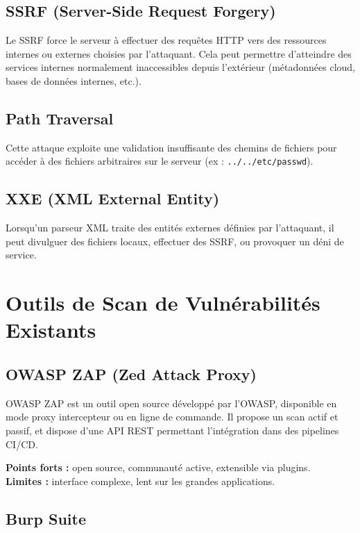 \documentclass[12pt, a4paper]{report}
\begin{document}
\subsection{SSRF (Server-Side Request Forgery)}

Le SSRF force le serveur à effectuer des requêtes HTTP vers des ressources
internes ou externes choisies par l'attaquant. Cela peut permettre d'atteindre
des services internes normalement inaccessibles depuis l'extérieur (métadonnées
cloud, bases de données internes, etc.).

\subsection{Path Traversal}

Cette attaque exploite une validation insuffisante des chemins de fichiers pour
accéder à des fichiers arbitraires sur le serveur (ex : \texttt{../../etc/passwd}).

\subsection{XXE (XML External Entity)}

Lorsqu'un parseur XML traite des entités externes définies par l'attaquant,
il peut divulguer des fichiers locaux, effectuer des SSRF, ou provoquer un déni
de service.

\section{Outils de Scan de Vulnérabilités Existants}

\subsection{OWASP ZAP (Zed Attack Proxy)}

OWASP ZAP est un outil open source développé par l'OWASP, disponible en mode
proxy intercepteur ou en ligne de commande. Il propose un scan actif et passif,
et dispose d'une API REST permettant l'intégration dans des pipelines CI/CD.

\textbf{Points forts :} open source, communauté active, extensible via plugins.\\
\textbf{Limites :} interface complexe, lent sur les grandes applications.

\subsection{Burp Suite}
\end{document}
